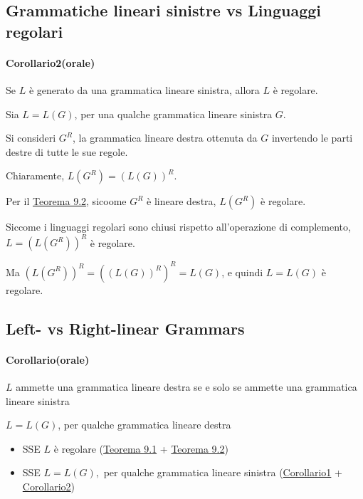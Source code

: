 \documentclass{article}
\begin{document}
\newpage
\subsection{Grammatiche lineari sinistre vs Linguaggi regolari}
\paragraph{Corollario2(orale)}
\label{corollario-9.2}
\text{}
Se $L$ è generato da una grammatica lineare sinistra, allora $L$ è regolare.

\begin{tcolorbox}[colback=blue!10!white, colframe=blue!50!black, title=Dimostrazione]
    Sia $L = L(G)$, per una qualche grammatica lineare sinistra $G$.

    Si consideri $G^R$, la grammatica lineare destra ottenuta da $G$ invertendo le parti destre di tutte le sue regole.
    
    Chiaramente, $L(G^R) = (L(G))^R$.

    Per il \hyperref[teorema-9.2]{Teorema 9.2}, sicoome $G^R$ è lineare destra, $L(G^R)$ è regolare.
    
    Siccome i linguaggi regolari sono chiusi rispetto all'operazione di complemento, $L = (L(G^R))^R$ è regolare.

    Ma $(L(G^R))^R = ((L(G))^R)^R = L(G)$, e quindi $L = L(G)$ è regolare.
\end{tcolorbox}

\subsection{Left- vs Right-linear Grammars}
\paragraph{Corollario(orale)}
\label{corollario-9.3}
\text{}
$L$ ammette una grammatica lineare destra se e solo se ammette una grammatica lineare sinistra
\begin{tcolorbox}[colback=blue!10!white, colframe=blue!50!black, title=Dimostrazione]
    $L = L(G)$, per qualche grammatica lineare destra
    \begin{itemize}
        \item SSE $L$ è regolare (\hyperref[teorema-9.1]{Teorema 9.1} + \hyperref[teorema-9.2]{Teorema 9.2})
        \item SSE $L = L(G),$ per qualche grammatica lineare sinistra (\hyperref[corollario-9.1]{Corollario1} + \hyperref[corollario-9.2]{Corollario2})
    \end{itemize}
\end{tcolorbox}
\end{document}
